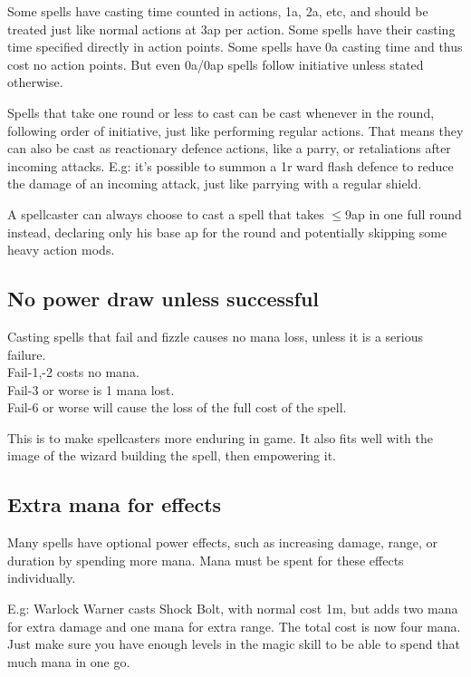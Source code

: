 Some spells have casting time counted in actions, 1a, 2a, etc, and should be treated just like normal actions at 3ap per action. Some spells have their casting time specified directly in action points. Some spells have 0a casting time and thus cost no action points. But even 0a/0ap spells follow initiative unless stated otherwise.

Spells that take one round or less to cast can be cast whenever in the round, following order of initiative, just like performing regular actions. That means they can also be cast as reactionary defence actions, like a parry, or retaliations after incoming attacks.
E.g: it's possible to summon a 1r ward flash defence to reduce the damage of an incoming attack, just like parrying with a regular shield.

A spellcaster can always choose to cast a spell that takes $\le$9ap in one full round instead, declaring only his base ap for the round and potentially skipping some heavy action mods. 


\subsection*{No power draw unless successful}
Casting spells that fail and fizzle causes no mana loss, unless it is a serious failure.\\
Fail-1,-2 costs no mana. \\
Fail-3 or worse is 1 mana lost. \\
Fail-6 or worse will cause the loss of the full cost of the spell.

This is to make spellcasters more enduring in game. It also fits well with the image of the wizard building the spell, then empowering it.


\subsection*{Extra mana for effects}
Many spells have optional power effects, such as increasing damage, range, or duration by spending more mana. Mana must be spent for these effects individually.

E.g: Warlock Warner casts Shock Bolt, with normal cost 1m, but adds two mana for extra damage and one mana for extra range. The total cost is now four mana.
Just make sure you have enough levels in the magic skill to be able to spend that much mana in one go.


